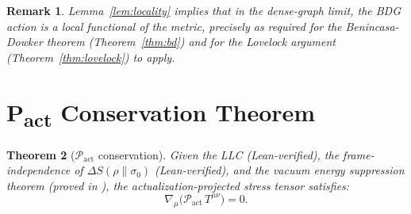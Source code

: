 \documentclass[11pt,a4paper]{article}
\newtheorem{theorem}{Theorem}[section]
\newtheorem{remark}[theorem]{Remark}
\newcommand{\Pact}{\mathcal{P}_{\mathrm{act}}}
\newcommand{\dS}{\Delta S}
\begin{document}
\begin{remark}
Lemma~\ref{lem:locality} implies that in the dense-graph limit, the
BDG action is a \emph{local} functional of the metric, precisely as
required for the Benincasa-Dowker theorem (Theorem~\ref{thm:bd}) and
for the Lovelock argument (Theorem~\ref{thm:lovelock}) to apply.
\end{remark}

\section{P\textsubscript{act} Conservation Theorem}
\label{sec:P_act}

\begin{theorem}[$\Pact$ conservation]
\label{thm:P_act}
Given the LLC (Lean-verified), the frame-independence of $\dS(\rho\|\sigma_0)$
(Lean-verified), and the vacuum energy suppression theorem
(proved in \citep{Sandeman2026RAGC}), the actualization-projected
stress tensor satisfies:
\begin{equation}
  \nabla_\mu\!\bigl(\Pact\,T^{\mu\nu}\bigr) = 0.
  \label{eq:P_act_conservation}
\end{equation}
\end{theorem}
\end{document}
